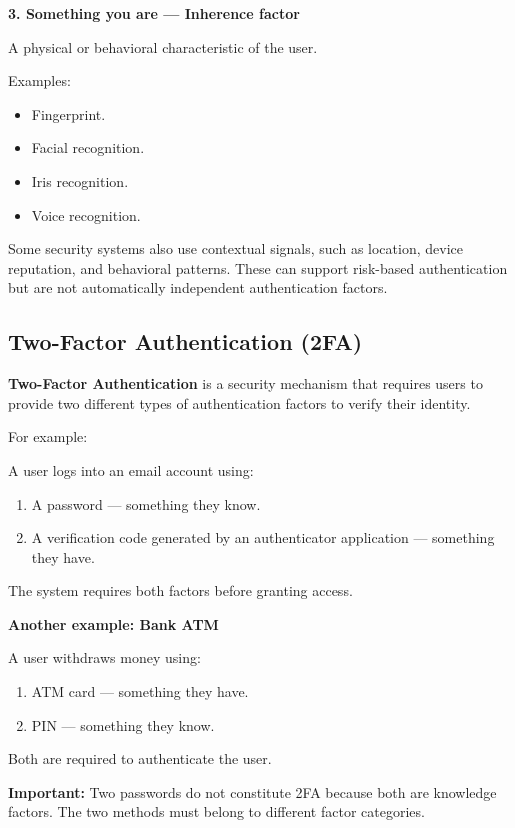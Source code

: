\textbf{3. Something you are --- Inherence factor}

A physical or behavioral characteristic of the user.

Examples:

\begin{itemize}
\item Fingerprint.
\item Facial recognition.
\item Iris recognition.
\item Voice recognition.
\end{itemize}

Some security systems also use contextual signals, such as location, device reputation, and behavioral patterns. These can support risk-based authentication but are not automatically independent authentication factors.

\subsection{Two-Factor Authentication (2FA)}

\textbf{Two-Factor Authentication} is a security mechanism that requires users to provide two different types of authentication factors to verify their identity.

For example:

A user logs into an email account using:

\begin{enumerate}
\item A password --- something they know.
\item A verification code generated by an authenticator application --- something they have.
\end{enumerate}

The system requires both factors before granting access.

\textbf{Another example: Bank ATM}

A user withdraws money using:

\begin{enumerate}
\item ATM card --- something they have.
\item PIN --- something they know.
\end{enumerate}

Both are required to authenticate the user.

\textbf{Important:} Two passwords do not constitute 2FA because both are knowledge factors. The two methods must belong to different factor categories.

